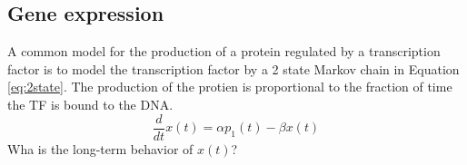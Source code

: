 \documentclass[12pt,letterpaper]{exam}
\begin{document}
\subsection*{Gene expression}
A common model for the production of a protein regulated by a transcription factor is to model the transcription factor by a 2 state Markov chain in Equation \eqref{eq:2state}. The production of the protien is proportional to the fraction of time the TF is bound to the DNA. 
\begin{equation}
\frac{d}{dt}x(t) = \alpha p_1(t) - \beta x(t)
\end{equation}
Wha is the long-term behavior of $x(t)$? 
\end{document}
